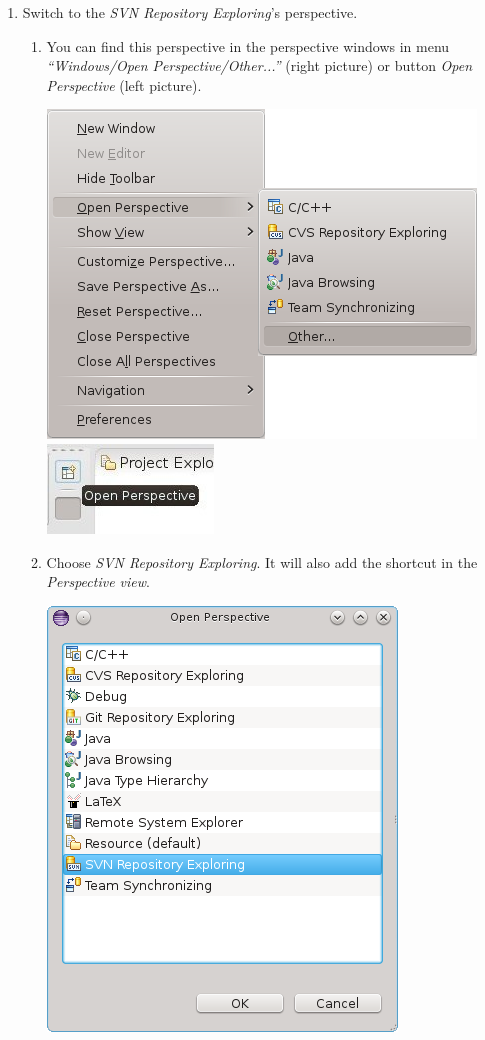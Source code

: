 \documentclass[a4paper]{article}
\begin{document}
\begin{enumerate}
\item Switch to the \emph{SVN Repository Exploring}'s perspective. 
\begin{enumerate}
\item You can find this perspective in the perspective windows in menu \emph{``Windows/Open Perspective/Other...''} (right picture)
or button \emph{Open Perspective} (left picture).
\label{enum:it:choosePers}
\begin{center}
\noindent
\includegraphics[scale=0.4]{eclipse/01-eclipseJUNO-openPerspective1.png}
\includegraphics[scale=0.4]{eclipse/01-eclipseJUNO-openPerspective2.jpg}
\end{center}

\item Choose \emph{SVN Repository Exploring}. It will also add the shortcut in the \emph{Perspective view}.
\begin{center}
\noindent
\includegraphics[scale=0.4]{eclipse/01-eclipseJUNO-openPerspective3.png}
\end{center}
\end{enumerate}



\end{enumerate}
\end{document}
